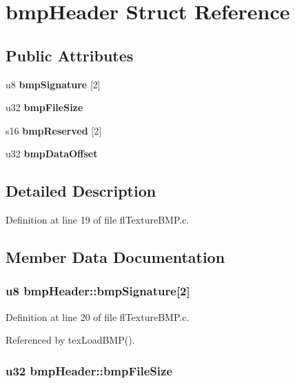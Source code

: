 \section{bmp\-Header Struct Reference}
\label{structbmpHeader}
\subsection*{Public Attributes}
\begin{CompactItemize}
\item 
u8 {\bf bmp\-Signature} [2]
\item 
u32 {\bf bmp\-File\-Size}
\item 
s16 {\bf bmp\-Reserved} [2]
\item 
u32 {\bf bmp\-Data\-Offset}
\end{CompactItemize}


\subsection{Detailed Description}




Definition at line 19 of file fl\-Texture\-BMP.c.

\subsection{Member Data Documentation}
\subsubsection{\setlength{\rightskip}{0pt plus 5cm}u8 {\bf bmp\-Header::bmp\-Signature}[2]}\label{structbmpHeader_2b99d635c94593e19af83dd1947a84c5}




Definition at line 20 of file fl\-Texture\-BMP.c.

Referenced by tex\-Load\-BMP().
\subsubsection{\setlength{\rightskip}{0pt plus 5cm}u32 {\bf bmp\-Header::bmp\-File\-Size}}\label{structbmpHeader_aa158173b6d44632f504be13f72fd5f5}




